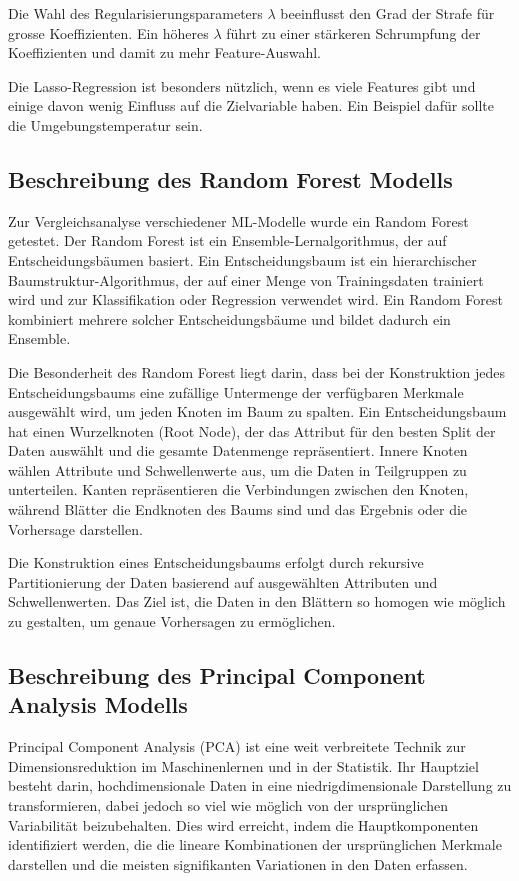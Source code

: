 Die Wahl des Regularisierungsparameters $\lambda$ beeinflusst den Grad der Strafe für grosse Koeffizienten. Ein höheres $\lambda$ führt zu einer stärkeren Schrumpfung der Koeffizienten und damit zu mehr Feature-Auswahl.

Die Lasso-Regression ist besonders nützlich, wenn es viele Features gibt und einige davon wenig Einfluss auf die Zielvariable haben. Ein Beispiel dafür sollte die Umgebungstemperatur sein.

\subsection{Beschreibung des Random Forest Modells}
Zur Vergleichsanalyse verschiedener ML-Modelle wurde ein Random Forest getestet. Der Random Forest ist ein Ensemble-Lernalgorithmus, der auf Entscheidungsbäumen basiert. Ein Entscheidungsbaum ist ein hierarchischer Baumstruktur-Algorithmus, der auf einer Menge von Trainingsdaten trainiert wird und zur Klassifikation oder Regression verwendet wird. Ein Random Forest kombiniert mehrere solcher Entscheidungsbäume und bildet dadurch ein Ensemble.

Die Besonderheit des Random Forest liegt darin, dass bei der Konstruktion jedes Entscheidungsbaums eine zufällige Untermenge der verfügbaren Merkmale ausgewählt wird, um jeden Knoten im Baum zu spalten. Ein Entscheidungsbaum hat einen Wurzelknoten (Root Node), der das Attribut für den besten Split der Daten auswählt und die gesamte Datenmenge repräsentiert. Innere Knoten wählen Attribute und Schwellenwerte aus, um die Daten in Teilgruppen zu unterteilen. Kanten repräsentieren die Verbindungen zwischen den Knoten, während Blätter die Endknoten des Baums sind und das Ergebnis oder die Vorhersage darstellen.

Die Konstruktion eines Entscheidungsbaums erfolgt durch rekursive Partitionierung der Daten basierend auf ausgewählten Attributen und Schwellenwerten. Das Ziel ist, die Daten in den Blättern so homogen wie möglich zu gestalten, um genaue Vorhersagen zu ermöglichen.


\subsection{Beschreibung des Principal Component Analysis Modells}
Principal Component Analysis (PCA) ist eine weit verbreitete Technik zur Dimensionsreduktion im Maschinenlernen und in der Statistik. Ihr Hauptziel besteht darin, hochdimensionale Daten in eine niedrigdimensionale Darstellung zu transformieren, dabei jedoch so viel wie möglich von der ursprünglichen Variabilität beizubehalten. Dies wird erreicht, indem die Hauptkomponenten identifiziert werden, die die lineare Kombinationen der ursprünglichen Merkmale darstellen und die meisten signifikanten Variationen in den Daten erfassen.

